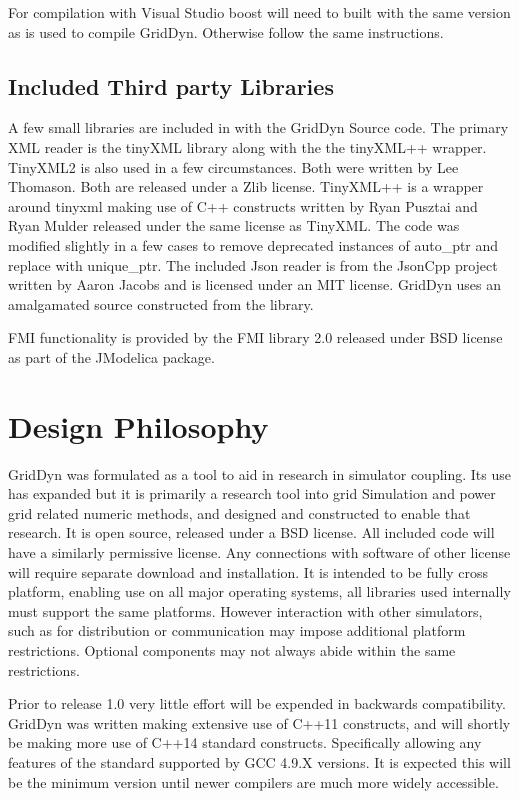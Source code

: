 \documentclass[12pt]{article} %
\begin{document}
For compilation with Visual Studio boost will need to built with the same version as is used to compile GridDyn.  Otherwise follow the same instructions.

\subsection{Included Third party Libraries}
A few small libraries are included in with the GridDyn Source code.  The primary XML reader is the tinyXML library along with the the tinyXML++ wrapper.  TinyXML2 is also used in a few circumstances.  Both were written by Lee Thomason.  Both are released under a Zlib license.  TinyXML++ is a wrapper around tinyxml making use of C++ constructs written by Ryan Pusztai and Ryan Mulder released under the same license as TinyXML.  The code was modified slightly in a few cases to remove deprecated instances of auto\_ptr and replace with unique\_ptr.  The included Json reader is from the JsonCpp project written by Aaron Jacobs and is licensed under an MIT license.  GridDyn uses an amalgamated source constructed from the library.

FMI functionality is provided by the FMI library 2.0 released under BSD license as part of the JModelica package.

\section {Design Philosophy}
GridDyn was formulated as a tool to aid in research in simulator coupling.  Its use has expanded but it is primarily a research tool into grid Simulation and power grid related numeric methods, and designed and constructed to enable that research.  It is open source, released under a BSD license.  All included code will have a similarly permissive license.  Any connections with software of other license will require separate download and installation.  It is intended to be fully cross platform,  enabling use on all major operating systems,  all libraries used internally must support the same platforms.  However interaction with other simulators, such as for distribution or communication may impose additional platform restrictions.  Optional components may not always abide within the same restrictions.

Prior to release 1.0 very little effort will be expended in backwards compatibility.  GridDyn was written making extensive use of C++11 constructs, and will shortly be making more use of C++14 standard constructs.  Specifically allowing any features of the standard supported by GCC 4.9.X versions.  It is expected this will be the minimum version until newer compilers are much more widely accessible.
\end{document}
